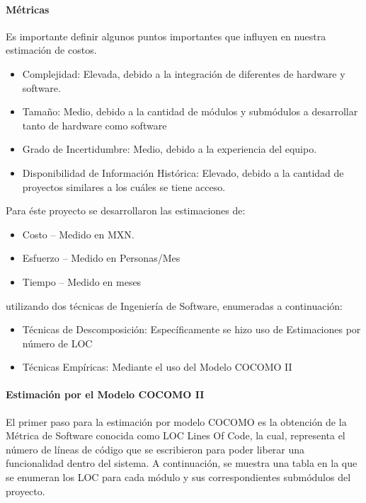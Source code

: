 \paragraph{Métricas} Es importante definir algunos puntos importantes que influyen en nuestra estimación de costos.
\begin{itemize}
	\item Complejidad: Elevada, debido a la integración de diferentes de hardware y software.
	\item Tamaño: Medio, debido a la cantidad de módulos y submódulos a desarrollar tanto de hardware como software
	\item Grado de Incertidumbre: Medio, debido a la experiencia del equipo.
	\item Disponibilidad de Información Histórica: Elevado, debido a la cantidad de proyectos similares a los cuáles se tiene acceso.
\end{itemize}

Para éste proyecto se desarrollaron las estimaciones de: 
\begin{itemize}
	\item Costo – Medido en MXN.
	\item Esfuerzo – Medido en Personas/Mes
	\item Tiempo – Medido en meses
\end{itemize}	

utilizando dos técnicas de Ingeniería de Software, enumeradas a continuación:

\begin{itemize}
	\item Técnicas de Descomposición: Específicamente se hizo uso de Estimaciones por número de LOC
	\item Técnicas Empíricas: Mediante el uso del Modelo COCOMO II
\end{itemize}
\paragraph{Estimación por el Modelo COCOMO II}
El primer paso para la estimación por modelo COCOMO es la obtención de la Métrica de Software conocida como LOC Lines Of Code, la cual, representa el número de líneas de código que se escribieron para poder liberar una funcionalidad dentro del sistema.
A continuación, se muestra una tabla en la que se enumeran los LOC para cada módulo y sus correspondientes submódulos del proyecto.



